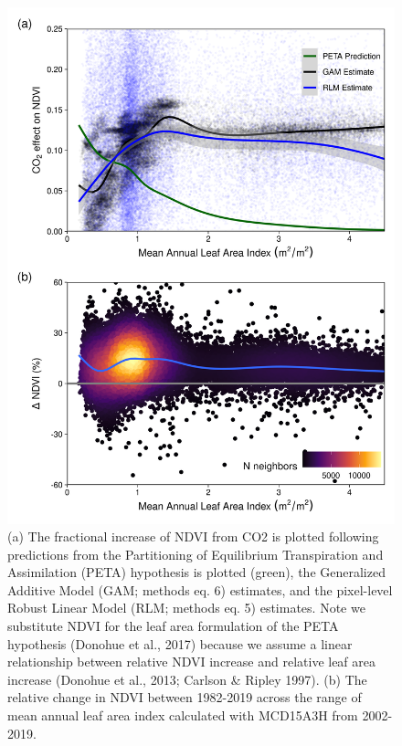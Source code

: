 \documentclass[gc, manuscript]{copernicus}
\begin{document}
\clearpage
\begin{figure}
\includegraphics[width=12cm]{../../figures/appendix-A/SM_Fig9_NDVI-CO2-effect-preds-xLAI_dNDVIxLAI} \caption{(a) The fractional increase of NDVI from CO2 is plotted following predictions from the Partitioning of Equilibrium Transpiration and Assimilation (PETA) hypothesis is plotted (green), the Generalized Additive Model (GAM; methods eq. 6) estimates, and the pixel-level Robust Linear Model (RLM; methods eq. 5) estimates. Note we substitute NDVI for the leaf area formulation of the PETA hypothesis (Donohue et al., 2017) because we assume a linear relationship between relative NDVI increase and relative leaf area increase (Donohue et al., 2013; Carlson \& Ripley 1997). (b) The relative change in NDVI between 1982-2019 across the range of mean annual leaf area index calculated with MCD15A3H from 2002-2019.}\label{fig:FigA9}
\end{figure}
\clearpage
\end{document}

